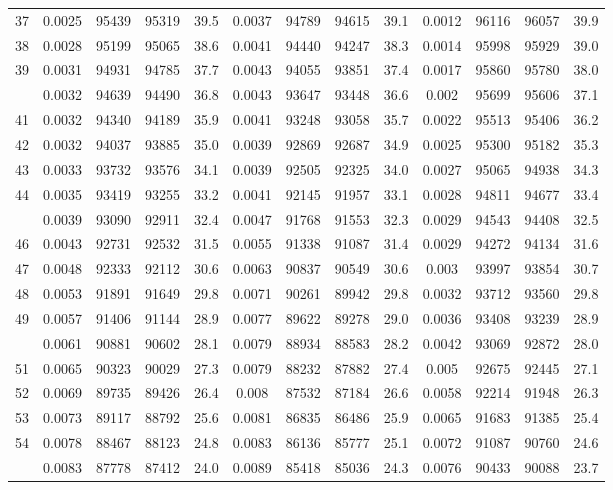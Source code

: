 \documentclass[
  14pt,
]{article}
\begin{document}
\begin{longtable}[t]{lcccccccccccc}
37 & 0.0025 & 95439 & 95319 & 39.5 & 0.0037 & 94789 & 94615 & 39.1 & 0.0012 & 96116 & 96057 & 39.9\\
38 & 0.0028 & 95199 & 95065 & 38.6 & 0.0041 & 94440 & 94247 & 38.3 & 0.0014 & 95998 & 95929 & 39.0\\
39 & 0.0031 & 94931 & 94785 & 37.7 & 0.0043 & 94055 & 93851 & 37.4 & 0.0017 & 95860 & 95780 & 38.0\\
\addlinespace
40 & 0.0032 & 94639 & 94490 & 36.8 & 0.0043 & 93647 & 93448 & 36.6 & 0.002 & 95699 & 95606 & 37.1\\
41 & 0.0032 & 94340 & 94189 & 35.9 & 0.0041 & 93248 & 93058 & 35.7 & 0.0022 & 95513 & 95406 & 36.2\\
42 & 0.0032 & 94037 & 93885 & 35.0 & 0.0039 & 92869 & 92687 & 34.9 & 0.0025 & 95300 & 95182 & 35.3\\
43 & 0.0033 & 93732 & 93576 & 34.1 & 0.0039 & 92505 & 92325 & 34.0 & 0.0027 & 95065 & 94938 & 34.3\\
44 & 0.0035 & 93419 & 93255 & 33.2 & 0.0041 & 92145 & 91957 & 33.1 & 0.0028 & 94811 & 94677 & 33.4\\
\addlinespace
45 & 0.0039 & 93090 & 92911 & 32.4 & 0.0047 & 91768 & 91553 & 32.3 & 0.0029 & 94543 & 94408 & 32.5\\
46 & 0.0043 & 92731 & 92532 & 31.5 & 0.0055 & 91338 & 91087 & 31.4 & 0.0029 & 94272 & 94134 & 31.6\\
47 & 0.0048 & 92333 & 92112 & 30.6 & 0.0063 & 90837 & 90549 & 30.6 & 0.003 & 93997 & 93854 & 30.7\\
48 & 0.0053 & 91891 & 91649 & 29.8 & 0.0071 & 90261 & 89942 & 29.8 & 0.0032 & 93712 & 93560 & 29.8\\
49 & 0.0057 & 91406 & 91144 & 28.9 & 0.0077 & 89622 & 89278 & 29.0 & 0.0036 & 93408 & 93239 & 28.9\\
\addlinespace
50 & 0.0061 & 90881 & 90602 & 28.1 & 0.0079 & 88934 & 88583 & 28.2 & 0.0042 & 93069 & 92872 & 28.0\\
51 & 0.0065 & 90323 & 90029 & 27.3 & 0.0079 & 88232 & 87882 & 27.4 & 0.005 & 92675 & 92445 & 27.1\\
52 & 0.0069 & 89735 & 89426 & 26.4 & 0.008 & 87532 & 87184 & 26.6 & 0.0058 & 92214 & 91948 & 26.3\\
53 & 0.0073 & 89117 & 88792 & 25.6 & 0.0081 & 86835 & 86486 & 25.9 & 0.0065 & 91683 & 91385 & 25.4\\
54 & 0.0078 & 88467 & 88123 & 24.8 & 0.0083 & 86136 & 85777 & 25.1 & 0.0072 & 91087 & 90760 & 24.6\\
\addlinespace
55 & 0.0083 & 87778 & 87412 & 24.0 & 0.0089 & 85418 & 85036 & 24.3 & 0.0076 & 90433 & 90088 & 23.7\\

\end{longtable}
\end{document}
